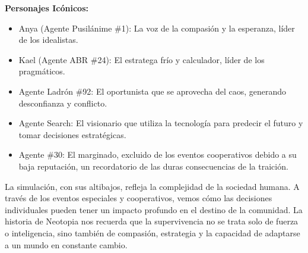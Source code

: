 \documentclass{article}
\begin{document}
\begin{tcolorbox}[enhanced, breakable,skin first=enhanced, skin middle=enhanced, skin last=enhanced]
      \textbf{Personajes Icónicos:}
      \begin{itemize}
            \item Anya (Agente Pusilánime \#1): La voz de la compasión y la esperanza, líder de los idealistas.
            \item Kael (Agente ABR \#24): El estratega frío y calculador, líder de los pragmáticos.
            \item Agente Ladrón \#92: El oportunista que se aprovecha del caos, generando desconfianza y conflicto.
            \item Agente Search: El visionario que utiliza la tecnología para predecir el futuro y tomar decisiones estratégicas.
            \item Agente \#30: El marginado, excluido de los eventos cooperativos debido a su baja reputación, un recordatorio de las duras consecuencias de la traición.
      \end{itemize}
      La simulación, con sus altibajos, refleja la complejidad de la sociedad humana. A través de los eventos especiales y cooperativos, vemos cómo las decisiones individuales pueden tener un impacto profundo en el destino de la comunidad. La historia de Neotopia nos recuerda que la supervivencia no se trata solo de fuerza o inteligencia, sino también de compasión, estrategia y la capacidad de adaptarse a un mundo en constante cambio.

\end{tcolorbox}
\newpage
\end{document}
